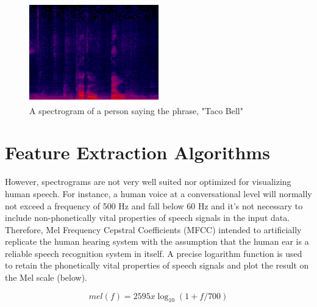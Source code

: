 \begin{figure}[th]
    \centering
    \includegraphics[width=0.5\textwidth]{Figures/tacobell.png}
    \decoRule
    \caption[Spectrogram]{A spectrogram of a person saying the phrase, "Taco Bell"}
    \label{fig:Spectrogram}
\end{figure}

\section{Feature Extraction Algorithms}

However, spectrograms are not very well suited nor optimized for visualizing human speech. For instance, a human voice at a conversational level will normally not exceed a frequency of 500 Hz and fall below 60 Hz and it’s not necessary to include non-phonetically vital properties of speech signals in the input data. Therefore, Mel Frequency Cepstral Coefficients (MFCC) intended to artificially replicate the human hearing system with the assumption that the human ear is a reliable speech recognition system in itself. A precise logarithm function is used to retain the phonetically vital properties of speech signals and plot the result on the Mel scale (below).

\[mel(f) = 2595 x \log_10(1+ f/700)\]

